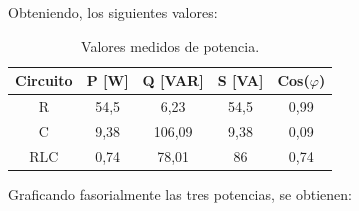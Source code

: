\documentclass[a4paper]{article}
\begin{document}
Obteniendo, los siguientes valores:

\begin{table}[H]
\centering
\begin{tabular}{|c|c|c|c|c|}
\hline
\textbf{Circuito} & \textbf{P {[}W{]}} & \textbf{Q {[}VAR{]}} & \textbf{S {[}VA{]}} & \textbf{Cos($\varphi$)} \\ \hline
R                 & 54,5               & 6,23                 & 54,5                & 0,99                                \\ \hline
C                 & 9,38               & 106,09               & 9,38                & 0,09                                \\ \hline
RLC               & 0,74               & 78,01                & 86                  & 0,74                                \\ \hline
\end{tabular}
\caption{Valores medidos de potencia.}
\end{table}

Graficando fasorialmente las tres potencias, se obtienen:
\end{document}
